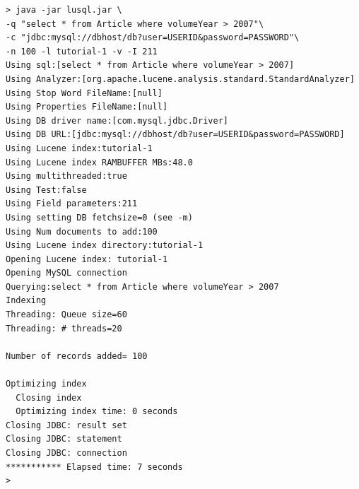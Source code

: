 {\small 
\begin{lstlisting}[backgroundcolor=\color{grey}]
> java -jar lusql.jar \
-q "select * from Article where volumeYear > 2007"\
-c "jdbc:mysql://dbhost/db?user=USERID&password=PASSWORD"\
-n 100 -l tutorial-1 -v -I 211
Using sql:[select * from Article where volumeYear > 2007]
Using Analyzer:[org.apache.lucene.analysis.standard.StandardAnalyzer]
Using Stop Word FileName:[null]
Using Properties FileName:[null]
Using DB driver name:[com.mysql.jdbc.Driver]
Using DB URL:[jdbc:mysql://dbhost/db?user=USERID&password=PASSWORD]
Using Lucene index:tutorial-1
Using Lucene index RAMBUFFER MBs:48.0
Using multithreaded:true
Using Test:false
Using Field parameters:211
Using setting DB fetchsize=0 (see -m)
Using Num documents to add:100
Using Lucene index directory:tutorial-1
Opening Lucene index: tutorial-1
Opening MySQL connection
Querying:select * from Article where volumeYear > 2007
Indexing
Threading: Queue size=60
Threading: # threads=20

Number of records added= 100

Optimizing index
  Closing index
  Optimizing index time: 0 seconds
Closing JDBC: result set
Closing JDBC: statement
Closing JDBC: connection
*********** Elapsed time: 7 seconds
>
\end{lstlisting}
}



